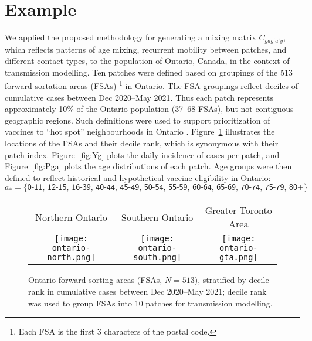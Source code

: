 \section{Example}\label{ex}
We applied the proposed methodology for generating a mixing matrix $C_{gag'a'y}$,
which reflects patterns of age mixing, recurrent mobility between patches, and different contact types,
to the population of Ontario, Canada, in the context of \covid transmission modelling.
Ten patches were defined based on groupings of the 513 forward sortation areas (FSAs)%
\footnote{Each FSA is the first 3 characters of the postal code.} in Ontario.
The FSA groupings reflect deciles of cumulative \covid cases between Dec 2020--May 2021.
Thus each patch represents approximately 10\% of the Ontario population (\mbox{37--68} FSAs),
but not contiguous geographic regions.
Such definitions were used to support prioritization of \covid vaccines
to ``hot spot'' neighbourhoods in Ontario \cite{Mishra2021}.
Figure~\ref{fig:map} illustrates the locations of the FSAs and their decile rank,
which is synonymous with their patch index.
Figure~\ref{fig:Yg} plots the daily incidence of \covid cases per patch, and
Figure~\ref{fig:Pga} plots the age distributions of each patch.
Age groups were then defined to reflect historical and hypothetical \covid vaccine eligibility in Ontario:
\begin{equation}
  a_* = \big\{\textsf{0-11, 12-15, 16-39, 40-44, 45-49, 50-54, 55-59, 60-64, 65-69, 70-74, 75-79, 80+}\big\}
\end{equation}
\begin{figure}
  \centering
  \setlength{\tabcolsep}{0pt}
  \begin{tabular}{ccc}
    Northern Ontario & Southern Ontario & Greater Toronto Area\\
    \texttt{[image: ontario-north.png]} &
    \texttt{[image: ontario-south.png]} &
    \texttt{[image: ontario-gta.png]}
  \end{tabular}
  \caption{Ontario forward sorting areas (FSAs, $N=513$),
    stratified by decile rank in cumulative \covid cases between Dec 2020--May 2021; %
    decile rank was used to group FSAs into 10 patches for transmission modelling.}
  \label{fig:map}
\end{figure}
